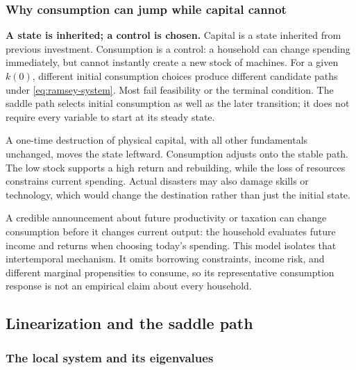 \subsubsection{Why consumption can jump while capital cannot}

\begin{blueblock}
\textbf{A state is inherited; a control is chosen.}
Capital is a state inherited from previous investment. Consumption is a control:
a household can change spending immediately, but cannot instantly create a
new stock of machines. For a given $k(0)$, different initial consumption choices
produce different candidate paths under \eqref{eq:ramsey-system}. Most fail
feasibility or the terminal condition. The saddle path selects initial
consumption as well as the later transition; it does not require every variable
to start at its steady state.
\end{blueblock}

A one-time destruction of physical capital, with all other fundamentals
unchanged, moves the state leftward. Consumption adjusts onto the stable path.
The low stock supports a high return and rebuilding, while the loss of resources
constrains current spending. Actual disasters may also damage skills or
technology, which would change the destination rather than just the initial state.

A credible announcement about future productivity or taxation can change
consumption before it changes current output: the household evaluates future
income and returns when choosing today's spending. This model isolates that
intertemporal mechanism. It omits borrowing constraints, income risk, and
different marginal propensities to consume, so its representative consumption
response is not an empirical claim about every household.

\subsection{Linearization and the saddle path}

\subsubsection{The local system and its eigenvalues}

